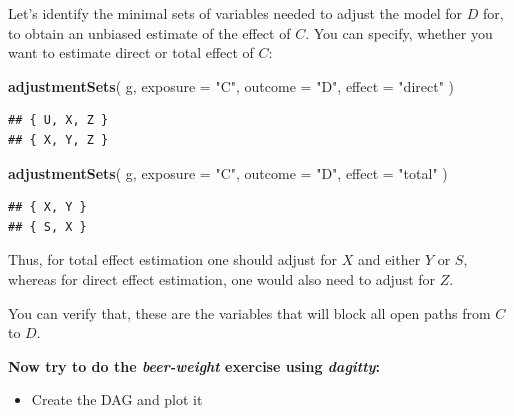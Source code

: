 \documentclass[
]{book}
\newenvironment{Shaded}{\begin{snugshade}}{\end{snugshade}}
\newcommand{\AttributeTok}[1]{\textcolor[rgb]{0.13,0.29,0.53}{#1}}
\newcommand{\FunctionTok}[1]{\textcolor[rgb]{0.13,0.29,0.53}{\textbf{#1}}}
\newcommand{\NormalTok}[1]{#1}
\newcommand{\StringTok}[1]{\textcolor[rgb]{0.31,0.60,0.02}{#1}}
\providecommand{\tightlist}{%
  \setlength{\itemsep}{0pt}\setlength{\parskip}{0pt}}
\theoremstyle{definition}
\theoremstyle{definition}
\theoremstyle{definition}
\theoremstyle{definition}
\theoremstyle{remark}
\begin{document}
Let's identify the minimal sets of variables needed to adjust the model for \(D\) for, to obtain an unbiased estimate of the effect of \(C\). You can specify, whether you want to estimate direct or total effect of \(C\):

\begin{Shaded}
\begin{Highlighting}[]
\FunctionTok{adjustmentSets}\NormalTok{(}
\NormalTok{  g, }\AttributeTok{exposure =} \StringTok{"C"}\NormalTok{, }\AttributeTok{outcome =} \StringTok{"D"}\NormalTok{, }\AttributeTok{effect =} \StringTok{"direct"}
\NormalTok{)}
\end{Highlighting}
\end{Shaded}

\begin{verbatim}
## { U, X, Z }
## { X, Y, Z }
\end{verbatim}

\begin{Shaded}
\begin{Highlighting}[]
\FunctionTok{adjustmentSets}\NormalTok{(}
\NormalTok{  g, }\AttributeTok{exposure =} \StringTok{"C"}\NormalTok{, }\AttributeTok{outcome =} \StringTok{"D"}\NormalTok{, }\AttributeTok{effect =} \StringTok{"total"}
\NormalTok{)}
\end{Highlighting}
\end{Shaded}

\begin{verbatim}
## { X, Y }
## { S, X }
\end{verbatim}

Thus, for total effect estimation one should adjust for \(X\) and either \(Y\) or \(S\), whereas for direct effect estimation, one would also need to adjust for \(Z\).

You can verify that, these are the variables that will block all open paths from \(C\) to \(D\).

\textbf{Now try to do the \emph{beer-weight} exercise using \emph{dagitty}:}

\begin{itemize}
\tightlist
\item
  Create the DAG and plot it
\end{itemize}
\end{document}

